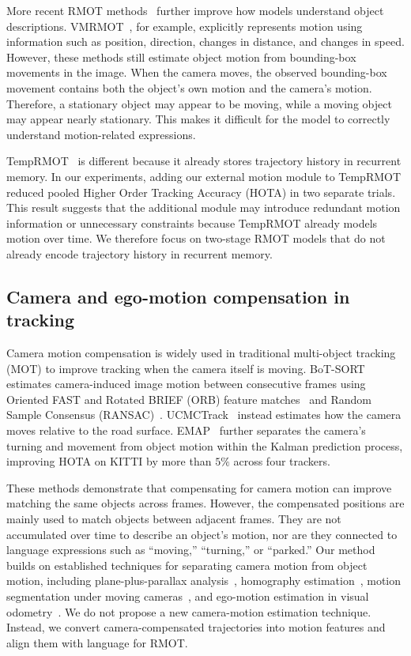 \documentclass[sigconf,anonymous,nonacm]{acmart}
\begin{document}
More recent RMOT methods~\cite{mlstrack,deeprmot,cdrmot,tellmewhat} further improve how models understand object descriptions. VMRMOT~\cite{vmrmot}, for example, explicitly represents motion using information such as position, direction, changes in distance, and changes in speed. However, these methods still estimate object motion from bounding-box movements in the image. When the camera moves, the observed bounding-box movement contains both the object’s own motion and the camera’s motion. Therefore, a stationary object may appear to be moving, while a moving object may appear nearly stationary. This makes it difficult for the model to correctly understand motion-related expressions.

TempRMOT~\cite{temprmot} is different because it already stores trajectory history in recurrent memory. In our experiments, adding our external motion module to TempRMOT reduced pooled Higher Order Tracking Accuracy (HOTA) in two separate trials. This result suggests that the additional module may introduce redundant motion information or unnecessary constraints because TempRMOT already models motion over time. We therefore focus on two-stage RMOT models that do not already encode trajectory history in recurrent memory.

\subsection{Camera and ego-motion compensation in tracking}

Camera motion compensation is widely used in traditional multi-object tracking (MOT) to improve tracking when the camera itself is moving. BoT-SORT~\cite{botsort} estimates camera-induced image motion between consecutive frames using Oriented FAST and Rotated BRIEF (ORB) feature matches~\cite{orb} and Random Sample Consensus (RANSAC)~\cite{ransac}. UCMCTrack~\cite{ucmctrack} instead estimates how the camera moves relative to the road surface. EMAP~\cite{emap} further separates the camera's turning and movement from object motion within the Kalman prediction process, improving HOTA on KITTI by more than $5\%$ across four trackers.

These methods demonstrate that compensating for camera motion can improve matching the same objects across frames. However, the compensated positions are mainly used to match objects between adjacent frames. They are not accumulated over time to describe an object's motion, nor are they connected to language expressions such as ``moving,'' ``turning,'' or ``parked.'' Our method builds on established techniques for separating camera motion from object motion, including plane-plus-parallax analysis~\cite{iranianandan}, homography estimation~\cite{hartleyzisserman}, motion segmentation under moving cameras~\cite{bideau}, and ego-motion estimation in visual odometry~\cite{scaramuzza}. We do not propose a new camera-motion estimation technique. Instead, we convert camera-compensated trajectories into motion features and align them with language for RMOT.
\end{document}
